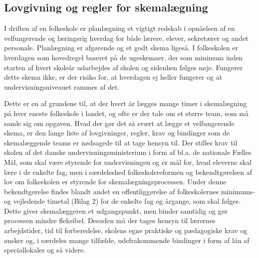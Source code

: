 \subsection{Lovgivning og regler for skemalægning}
\label{Lovgivning og regler}
I driften af en folkeskole er planlægning et vigtigt redskab i opnåelsen af en velfungerende og læringsrig hverdag for både lærere, elever, sekretærer og andet personale. Planlægning er afgørende og et godt skema ligeså. I folkeskolen er hverdagen som hovedregel baseret på de ugeskemaer, der som minimum inden starten af hvert skoleår udarbejdes af skolen og sidenhen følges nøje\cite{interview_Kaerby}. Fungerer dette skema ikke, er der risiko for, at hverdagen ej heller fungerer og at undervisningsniveauet rammes af det.

Dette er en af grundene til, at der hvert år lægges mange timer i skemalægning på hver eneste folkeskole i landet, og ofte er der tale om et større team\cite{interview_Kaerby}\cite{interview_Tingstrup}, som må samle sig om opgaven. Hvad der gør det så svært at lægge et velfungerende skema, er den lange liste af lovgivninger, regler, krav og bindinger som de skemalæggende teams er nødsagede til at tage hensyn til. Der stilles krav til skolen af det danske undervisningsministerium i form af bl.a. de nationale Fælles Mål\cite{fmaal}, som skal være styrende for undervisningen og er mål for, hvad eleverne skal lære i de enkelte fag, men i særdeleshed folkeskolereformen og bekendtgørelsen af lov om folkeskolen\cite{Lovgivning} er styrende for skemalægningsprocessen. Under denne bekendtgørelse findes blandt andet en offentliggørelse af folkeskolernes minimums- og vejledende timetal (Bilag 2) for de enkelte fag og årgange, som skal følges. Dette giver skemalæggeren et udgangspunkt, men binder samtidig og gør processen mindre fleksibel. Desuden må der tages hensyn til lærernes arbejdstider, tid til forberedelse, skolens egne praktiske og pædagogiske krav og ønsker og, i særdeles mange tilfælde, udefrakommende bindinger i form af lån af speciallokaler og så videre.
